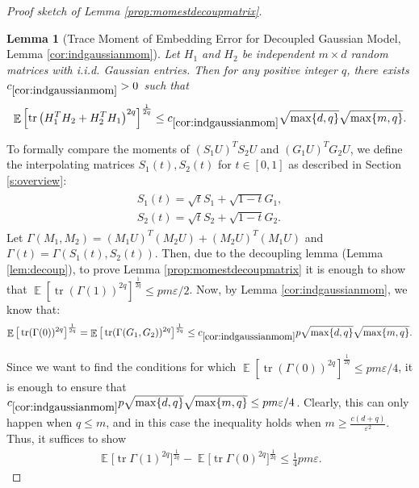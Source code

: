 \documentclass[11pt]{amsart}
\numberwithin{equation}{section}
\numberwithin{equation}{section}
\DeclareMathOperator{\E}{\mathbb{E}}
\DeclareMathOperator*{\tr}{tr}
\newtheorem*{lemmanon}{Lemma}
\theoremstyle{remark}
\theoremstyle{definition}
\begin{document}
\begin{proof}[Proof sketch of Lemma \ref{prop:momestdecoupmatrix}]
\begin{lemmanon}[Trace Moment of Embedding Error for Decoupled Gaussian Model, Lemma \ref{cor:indgaussianmom}]
    Let $H_1$ and $H_2$ be independent $m \times d$ random matrices with i.i.d. Gaussian entries. Then for any positive integer $q$, there exists $c_{\ref*{cor:indgaussianmom}}>0$ such that 
    \[ \E \left[ \tr \left( H_1^TH_2 + H_2^TH_1 \right)^{2q} \right]^\frac{1}{2q} \le c_{\ref*{cor:indgaussianmom}}\sqrt{\max\{d, q\}}\sqrt{\max\{m, q\}}.\]
\end{lemmanon}


To formally compare the moments of $(S_1U)^TS_2U$ and $(G_1U)^TG_2U$, we define the interpolating matrices $S_1(t), S_2(t)$ for $t \in [0,1]$ as described in Section \ref{s:overview}:
\begin{align}
\begin{split} 
    S_1(t) = \sqrt{t}S_1 + \sqrt{1-t}G_1, \\
    S_2(t) = \sqrt{t}S_2 + \sqrt{1-t}G_2.
\end{split}
\end{align}
Let $\Gamma(M_1,M_2)=(M_1U)^T(M_2U)+(M_2U)^T(M_1U)$ and $\Gamma(t)=\Gamma(S_1(t),S_2(t))$. Then, due to the decoupling lemma (Lemma \ref{lem:decoup}), to prove Lemma \ref{prop:momestdecoupmatrix} it is enough to show that $\E[\tr(\Gamma(1))^{2q}]^\frac{1}{2q} \le pm\varepsilon/2$. Now, by Lemma \ref{cor:indgaussianmom}, we know that:
$$\E\big[\tr(\Gamma(0))^{2q}\big]^\frac{1}{2q} = \E\big[\tr(\Gamma(G_1, G_2))^{2q}\big]^\frac{1}{2q} \le c_{\ref*{cor:indgaussianmom}}p\sqrt{\max\{d, q\}}\sqrt{\max\{m, q\}}.$$ 

Since we want to find the conditions for which $\E[\tr(\Gamma(0))^{2q}]^\frac{1}{2q} \le pm\varepsilon/4$, it is enough to ensure that $c_{\ref*{cor:indgaussianmom}}p\sqrt{\max\{d, q\}}\sqrt{\max\{m, q\}} \le pm\varepsilon/4$. Clearly, this can only happen when $q \le m$, and in this case the inequality holds when $m \ge \frac{c(d+q)}{\varepsilon^2}$. Thus, it suffices to show
\begin{align} \label{eq:univbound}
    \E\big[\tr \Gamma(1)^{2q}\big]^{\frac{1}{2q}}-\E\big[\tr \Gamma(0)^{2q}\big]^{\frac{1}{2q}} \le \frac{1}{4} pm \varepsilon.
\end{align}


\end{proof}
\end{document}

